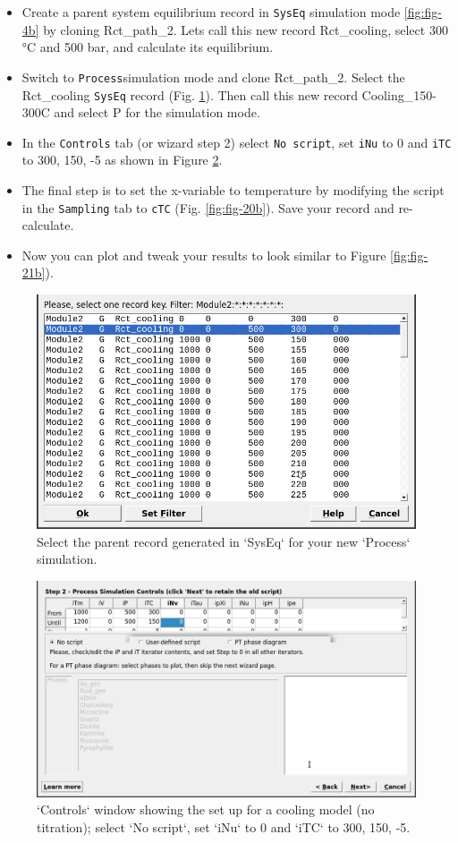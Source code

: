 \documentclass[
]{book}
\begin{document}
\begin{itemize}
\item
  Create a parent system equilibrium record in \texttt{SysEq} simulation mode \ref{fig:fig-4b} by cloning Rct\_path\_2. Lets call this new record Rct\_cooling, select 300 °C and 500 bar, and calculate its equilibrium.
\item
  Switch to \texttt{Process}simulation mode and clone Rct\_path\_2. Select the Rct\_cooling \texttt{SysEq} record (Fig. \ref{fig:fig-18b}). Then call this new record Cooling\_150-300C and select P for the simulation mode.
\item
  In the \texttt{Controls} tab (or wizard step 2) select \texttt{No\ script}, set \texttt{iNu} to 0 and \texttt{iTC} to 300, 150, -5 as shown in Figure \ref{fig:fig-19b}.
\item
  The final step is to set the x-variable to temperature by modifying the script in the \texttt{Sampling} tab to \texttt{cTC} (Fig. \ref{fig:fig-20b}). Save your record and re-calculate.
\item
  Now you can plot and tweak your results to look similar to Figure \ref{fig:fig-21b}).
\end{itemize}

\begin{figure}
\includegraphics[width=0.7\linewidth]{figures/module2/fig-18} \caption{Select the parent record generated in `SysEq` for your new `Process` simulation.}\label{fig:fig-18b}
\end{figure}

\begin{figure}
\includegraphics[width=0.8\linewidth]{figures/module2/fig-19} \caption{`Controls` window showing the set up for a cooling model (no titration); select `No script`, set `iNu` to 0 and `iTC` to 300, 150, -5.}\label{fig:fig-19b}
\end{figure}
\end{document}
